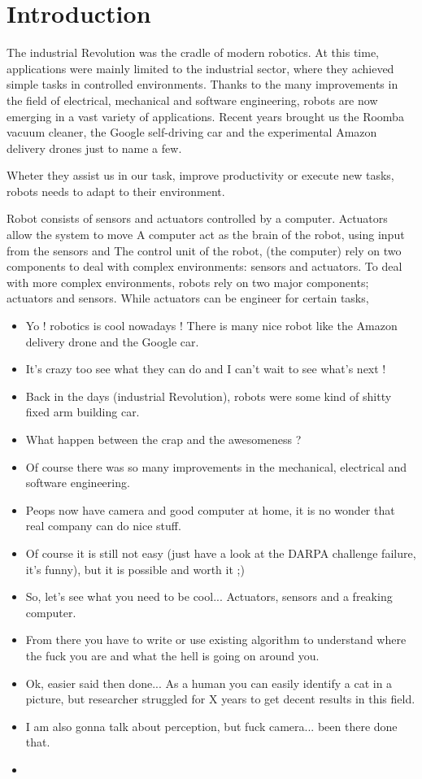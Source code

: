 \chapter*{Introduction}

The industrial Revolution was the cradle of modern robotics. At this time, applications were mainly limited to the industrial sector, where they achieved simple tasks in controlled environments. Thanks to the many improvements in the field of electrical, mechanical and software engineering, robots are now emerging in a vast variety of applications. Recent years brought us the Roomba vacuum cleaner, the Google self-driving car and the experimental Amazon delivery drones just to name a few.

Wheter they assist us in our task, improve productivity or execute new tasks, robots needs to adapt to their environment.

Robot consists of sensors and actuators controlled by a computer. Actuators allow the system to move
A computer act as the brain of the robot, using input from the sensors and
The control unit of the robot, (the computer) rely on two components to deal with  complex environments: sensors and actuators.
To deal with more complex environments, robots rely on two major components; actuators and sensors. While actuators can be engineer for certain tasks,


\begin{itemize}
    \item Yo ! robotics is cool nowadays ! There is many nice robot like the Amazon delivery drone and the Google car.
    \item It's crazy too see what they can do and I can't wait to see what's next !
    \item Back in the days (industrial Revolution), robots were some kind of shitty fixed arm building car.
    \item What happen between the crap and the awesomeness ?
    \item Of course there was so many improvements in the mechanical, electrical and software engineering.
    \item Peops now have camera and good computer at home, it is no wonder that real company can do nice stuff.
    \item Of course it is still not easy (just have a look at the DARPA challenge failure, it's funny), but it is possible and worth it ;)
    \item So, let's see what you need to be cool... Actuators, sensors and a freaking computer.
    \item From there you have to write or use existing algorithm to understand where the fuck you are and what the hell is going on around you.
    \item Ok, easier said then done... As a human you can easily identify a cat in a picture, but researcher struggled for X years to get decent results in this field.
    \item I am also gonna talk about perception, but fuck camera... been there done that.
    \item
\end{itemize}


